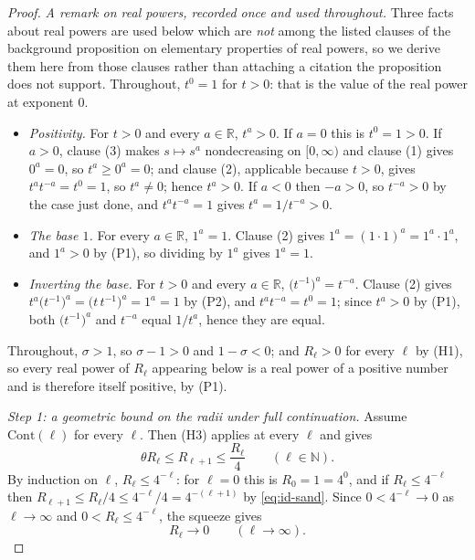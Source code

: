 \begin{proof}
\medskip\noindent\emph{A remark on real powers, recorded once and used throughout.}  Three facts
about real powers are used below which are \emph{not} among the listed clauses of the background
proposition on elementary properties of real powers, so we derive them here from those clauses
rather than attaching a citation the proposition does not support.  Throughout, $t^{0}=1$ for
$t>0$: that is the value of the real power at exponent $0$.
\begin{itemize}
\item[(P1)] \emph{Positivity.}  For $t>0$ and every $a\in\mathbb{R}$, $t^{a}>0$.  If $a=0$ this
is $t^{0}=1>0$.  If $a>0$, clause (3) makes $s\mapsto s^{a}$ nondecreasing on $[0,\infty)$ and
clause (1) gives $0^{a}=0$, so $t^{a}\ge0^{a}=0$; and clause (2), applicable because $t>0$,
gives $t^{a}t^{-a}=t^{0}=1$, so $t^{a}\ne0$; hence $t^{a}>0$.  If $a<0$ then $-a>0$, so
$t^{-a}>0$ by the case just done, and $t^{a}t^{-a}=1$ gives $t^{a}=1/t^{-a}>0$.
\item[(P2)] \emph{The base $1$.}  For every $a\in\mathbb{R}$, $1^{a}=1$.  Clause (2) gives
$1^{a}=(1\cdot1)^{a}=1^{a}\cdot1^{a}$, and $1^{a}>0$ by (P1), so dividing by $1^{a}$ gives
$1^{a}=1$.
\item[(P3)] \emph{Inverting the base.}  For $t>0$ and every $a\in\mathbb{R}$,
$\bigl(t^{-1}\bigr)^{a}=t^{-a}$.  Clause (2) gives
$t^{a}\bigl(t^{-1}\bigr)^{a}=\bigl(t\,t^{-1}\bigr)^{a}=1^{a}=1$ by (P2), and
$t^{a}t^{-a}=t^{0}=1$; since $t^{a}>0$ by (P1), both $\bigl(t^{-1}\bigr)^{a}$ and $t^{-a}$
equal $1/t^{a}$, hence they are equal.
\end{itemize}

Throughout, $\sigma>1$, so $\sigma-1>0$ and $1-\sigma<0$; and $R_\ell>0$ for every $\ell$ by
(H1), so every real power of $R_\ell$ appearing below is a real power of a positive number and is
therefore itself positive, by (P1).

\medskip\noindent\emph{Step 1: a geometric bound on the radii under full continuation.}
Assume $\mathrm{Cont}(\ell)$ for every $\ell$.  Then (H3) applies at every $\ell$ and gives
\begin{equation}\label{eq:id-sand}
  \theta R_\ell\le R_{\ell+1}\le\frac{R_\ell}{4}\qquad(\ell\in\mathbb{N}).
\end{equation}
By induction on $\ell$, $R_\ell\le4^{-\ell}$: for $\ell=0$ this is $R_0=1=4^{0}$, and if
$R_\ell\le4^{-\ell}$ then $R_{\ell+1}\le R_\ell/4\le4^{-\ell}/4=4^{-(\ell+1)}$ by
\eqref{eq:id-sand}.  Since $0<4^{-\ell}\to0$ as $\ell\to\infty$ and $0<R_\ell\le4^{-\ell}$, the
squeeze gives
\begin{equation}\label{eq:id-tendsto}
  R_\ell\to0\qquad(\ell\to\infty).
\end{equation}


\end{proof}
